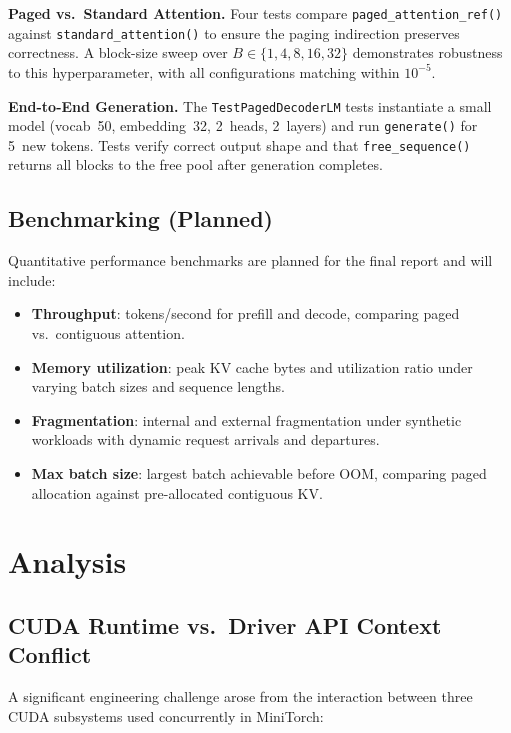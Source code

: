 \documentclass{article}
\begin{document}
\noindent\textbf{Paged vs.\ Standard Attention.}
Four tests compare \texttt{paged\_attention\_ref()} against \texttt{standard\_attention()} to ensure the paging indirection preserves correctness.
A block-size sweep over $B \in \{1, 4, 8, 16, 32\}$ demonstrates robustness to this hyperparameter, with all configurations matching within $10^{-5}$.

\noindent\textbf{End-to-End Generation.}
The \texttt{TestPagedDecoderLM} tests instantiate a small model (vocab~50, embedding~32, 2~heads, 2~layers) and run \texttt{generate()} for 5~new tokens.
Tests verify correct output shape and that \texttt{free\_sequence()} returns all blocks to the free pool after generation completes.

\subsection{Benchmarking (Planned)}

Quantitative performance benchmarks are planned for the final report and will include:
\begin{itemize}
    \item \textbf{Throughput}: tokens/second for prefill and decode, comparing paged vs.\ contiguous attention.
    \item \textbf{Memory utilization}: peak KV cache bytes and utilization ratio under varying batch sizes and sequence lengths.
    \item \textbf{Fragmentation}: internal and external fragmentation under synthetic workloads with dynamic request arrivals and departures.
    \item \textbf{Max batch size}: largest batch achievable before OOM, comparing paged allocation against pre-allocated contiguous KV.
\end{itemize}

\section{Analysis}
\label{sec:analysis}

\subsection{CUDA Runtime vs.\ Driver API Context Conflict}
\label{sec:cuda_conflict}

A significant engineering challenge arose from the interaction between three CUDA subsystems used concurrently in MiniTorch:
\end{document}
